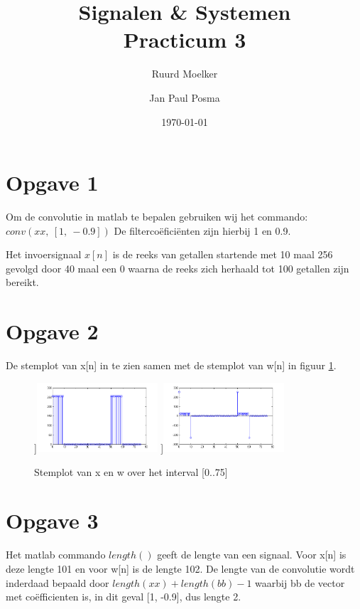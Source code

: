 \documentclass{article}
\author{Ruurd Moelker \and Jan Paul Posma}
\date{\today}
\title{Signalen \& Systemen \\Practicum 3}
\begin{document}
\maketitle
 
\section{Opgave 1}
Om de convolutie in matlab te bepalen gebruiken wij het commando:
$conv(xx,~[1,~-0.9])$
De filterco\"efici\"enten zijn hierbij 1 en 0.9.

Het invoersignaal $x[n]$ is de reeks van getallen startende met 10 maal 256 gevolgd door 40 maal een 0 waarna de reeks zich herhaald tot 100 getallen zijn bereikt.

\section{Opgave 2}
De stemplot van x[n] in te zien samen met de stemplot van w[n] in figuur \ref{fig:opgave2}.

\begin{figure}[h]
  \centering
 	\subfloat[][x[n]]{\includegraphics[width=0.4\textwidth]{content/2xx.png}}
	\subfloat[][w[n]]{\includegraphics[width=0.4\textwidth]{content/2ww.png}}
  \caption{Stemplot van x en w over het interval [0..75]}
  \label{fig:opgave2}
\end{figure}

\section{Opgave 3}
Het matlab commando $length()$ geeft de lengte van een signaal. Voor x[n] is deze lengte 101 en voor w[n] is de lengte 102. De lengte van de convolutie wordt inderdaad bepaald door $length(xx)+length(bb)-1$ waarbij bb de vector met co\"efficienten is, in dit geval [1, -0.9], dus lengte 2.
\end{document}

